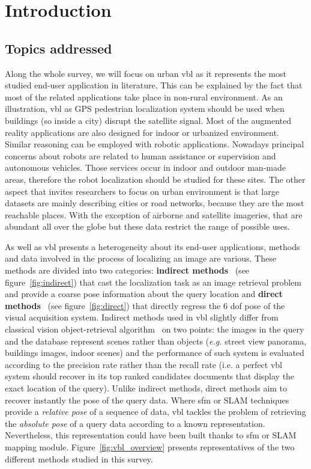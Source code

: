 \section{Introduction}
\label{sec:introduction}

	
	
	\subsection{Topics addressed}
		Along the whole survey, we will focus on urban \ac{vbl} as it represents the most studied end-user application in literature. This can be explained by the fact that most of the related applications take place in non-rural environment. As an illustration, \ac{vbl} as GPS pedestrian localization system should be used when buildings (so inside a city) disrupt the satellite signal. Most of the augmented reality applications are also designed for indoor or urbanized environment. Similar reasoning can be employed with robotic applications. Nowadays principal concerns about robots are related to human assistance or supervision and autonomous vehicles. Those services occur in indoor and outdoor man-made areas, therefore the robot localization should be studied for these sites. The other aspect that invites researchers to focus on urban environment is that large datasets are mainly describing cities or road networks, because they are the most reachable places. With the exception of airborne and satellite imageries, that are abundant all over the globe but these data restrict the range of possible uses.
				
		As well as \ac{vbl} presents a heterogeneity about its end-user applications, methods and data involved in the process of localizing an image are various. These methods are divided into two categories: \textbf{indirect methods}~\citep{Arandjelovic2012,Radenovic2016} (see figure~\ref{fig:indirect}) that cast the localization task as an image retrieval problem and provide a coarse pose information about the query location and \textbf{direct methods}~\citep{Kendall2015,Sattler2016a} (see figure~\ref{fig:direct}) that directly regress the 6 \ac{dof} pose of the visual acquisition system. Indirect methods used in \ac{vbl} slightly differ from classical vision object-retrieval algorithm~\citep{Sivic2003} on two points: the images in the query and the database represent scenes rather than objects (\textit{e.g.} street view panorama, buildings images, indoor scenes) and the performance of such system is evaluated according to the precision rate rather than the recall rate (i.e. a perfect \ac{vbl} system should recover in its top ranked candidates documents that display the exact location of the query). Unlike indirect methods, direct methods aim to recover instantly the pose of the query data. Where \ac{sfm} or SLAM techniques provide a \textit{relative pose} of a sequence of data, \ac{vbl} tackles the problem of retrieving the \textit{absolute pose} of a query data according to a known representation. Nevertheless, this representation could have been built thanks to \ac{sfm} or SLAM mapping module.
Figure~\ref{fig:vbl_overview} presents representatives of the two different methods studied in this survey.
			
